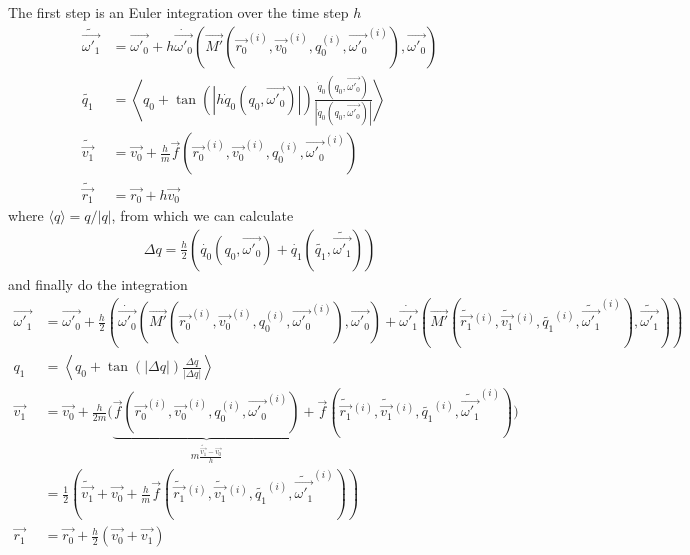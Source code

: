 \documentclass[class=report, float=false, crop=false]{standalone}
\begin{document}
The first step is an Euler integration over the time step $h$
\begin{align*}
\tilde{\vec{\omega'_1}} &= \vec{\omega'_0} + h\dot{\vec{\omega'_0}}(\vec{M'}(\vec{r_0}^{(i)},\vec{v_0}^{(i)},q_0^{(i)},\vec{\omega'_0}^{(i)}),\vec{\omega'_0})\\
\tilde{q_1} &= \left\langle q_0 + \tan\left(|h\dot{q}_0(q_0,\vec{\omega'_0})|\right) \frac{\dot{q}_0(q_0,\vec{\omega'_0})}{|\dot{q}_0(q_0,\vec{\omega'_0})|}\right\rangle\\
\tilde{\vec{v_1}} &= \vec{v_0} + \frac{h}{m} \vec{f}(\vec{r_0}^{(i)},\vec{v_0}^{(i)},q_0^{(i)},\vec{\omega'_0}^{(i)})\\
\tilde{\vec{r_1}} &= \vec{r_0} + h\vec{v_0}
\end{align*}
where $\langle q \rangle = q/|q|$, from which we can calculate
\begin{align*}
\Delta q = \frac{h}{2} \left( \dot{q_0}(q_0,\vec{\omega'_0}) + \dot{q_1}(\tilde{q_1},\tilde{\vec{\omega'_1}}) \right)
\end{align*}
and finally do the integration
\begin{align*}
\vec{\omega'_1} &= \vec{\omega'_0} + \frac{h}{2}\left(\dot{\vec{\omega'_0}}(\vec{M'}(\vec{r_0}^{(i)},\vec{v_0}^{(i)},q_0^{(i)},\vec{\omega'_0}^{(i)}),\vec{\omega'_0}) + \dot{\vec{\omega'_1}}(\vec{M'}(\tilde{\vec{r_1}}\hspace{1pt}^{(i)},\tilde{\vec{v_1}}\hspace{1pt}^{(i)},\tilde{q_1}^{(i)},\tilde{\vec{\omega\prime_1}}^{(i)}),\tilde{\vec{\omega'_1}}) \right)\\
q_1 &= \left\langle q_0 + \tan\left(|\Delta q|\right) \frac{\Delta q}{|\Delta q|} \right \rangle\\
\vec{v_1} &= \vec{v_0} + \frac{h}{2m} \Big( \underbrace{\vec{f}(\vec{r_0}^{(i)},\vec{v_0}^{(i)},q_0^{(i)},\vec{\omega'_0}^{(i)})}_{\textstyle m\frac{\tilde{\vec{v_1}} - \vec{v_0}}{h}} + \vec{f}(\tilde{\vec{r_1}}\hspace{1pt}^{(i)},\tilde{\vec{v_1}}\hspace{1pt}^{(i)},\tilde{q_1}^{(i)},\tilde{\vec{\omega\prime_1}}^{(i)}) \Big)\\
&= \frac{1}{2} \left(\tilde{\vec{v_1}} + \vec{v_0} + \frac{h}{m} \vec{f}(\tilde{\vec{r_1}}\hspace{1pt}^{(i)},\tilde{\vec{v_1}}\hspace{1pt}^{(i)},\tilde{q_1}^{(i)},\tilde{\vec{\omega\prime_1}}^{(i)}) \right)\\
\vec{r_1} &= \vec{r_0} + \frac{h}{2}\left(\vec{v_0} + \vec{v_1}\right)
\end{align*}

% 
\end{document}
